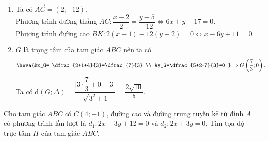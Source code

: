 \begin{bt}
{\begin{enumerate}
        \item Ta có $\overrightarrow{AC}=(2;-12)$.\\
        Phương trình đường thẳng $ AC \colon \dfrac{x-2}{2}=\dfrac{y-5}{-12}\Leftrightarrow 6x+y-17=0$.\\
        Phương trình đường cao $ BK\colon 2(x-1) -12(y-2)=0\Leftrightarrow x-6y+11=0$.
        \item $ G $ là trọng tâm của tam giác $ ABC $ nên ta có
        $$\heva{&x_G= \dfrac{2+1+4}{3}=\dfrac{7}{3} \\ &y_G=\dfrac{5+2-7}{3}=0 }\Rightarrow G\left(\dfrac{7}{3};0 \right).$$
        Ta có $\mathrm{d}(G;\Delta)=\dfrac{\bigg|3\cdot \dfrac{7}{3}+0-3\bigg|}{\sqrt{3^2+1}}=\dfrac{2\sqrt{10}}{5}$.
    \end{enumerate}
}
\end{bt}

\begin{bt}%
Cho tam giác $ABC$ có $C(4;-1)$, đường cao và đường trung tuyến kẻ từ đỉnh $A$ có phương trình lần lượt là $d_1 \colon 2x-3y+12=0$ và $d_2 \colon 2x+3y=0$. Tìm tọa độ trực tâm $H$ của tam giác $ABC$.
\end{bt}

